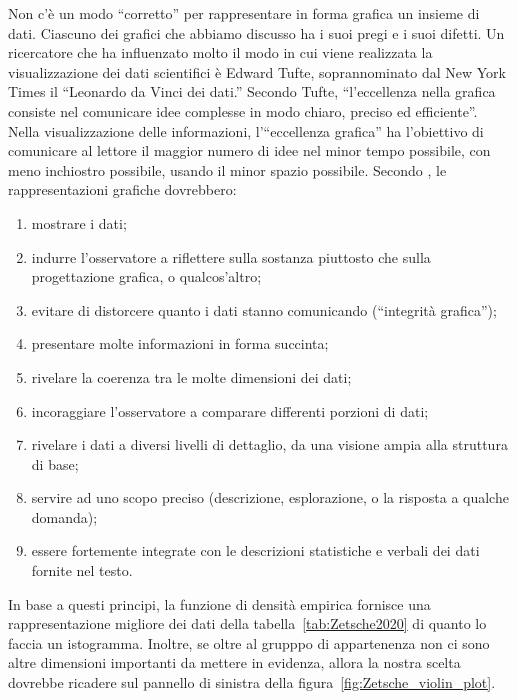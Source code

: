 Non c'è un modo ``corretto'' per rappresentare in forma grafica un insieme di dati.  
Ciascuno dei grafici che abbiamo discusso ha i suoi pregi e i suoi difetti.
Un ricercatore che ha influenzato molto il modo in cui viene realizzata la visualizzazione dei dati scientifici è Edward Tufte, soprannominato dal New York Times il ``Leonardo da Vinci dei dati.'' 
Secondo Tufte, ``l’eccellenza nella grafica consiste nel comunicare idee complesse in modo chiaro, preciso ed efficiente''. 
Nella visualizzazione delle informazioni, l'``eccellenza grafica'' ha l'obiettivo di comunicare al lettore il maggior numero di idee nel minor tempo possibile, con meno inchiostro possibile, usando il minor spazio possibile.
Secondo \citet{tufte_visual_display}, le rappresentazioni grafiche dovrebbero:
\begin{enumerate}
\item mostrare i dati;
\item indurre l'osservatore a riflettere sulla sostanza piuttosto che
sulla progettazione grafica, o qualcos'altro;
\item  evitare di distorcere quanto i dati stanno comunicando (``integrità grafica'');
\item  presentare molte informazioni in forma succinta;
\item  rivelare la coerenza tra le molte dimensioni dei dati;
\item  incoraggiare l'osservatore a comparare differenti porzioni di dati;
\item  rivelare i dati a diversi livelli di dettaglio, da una visione ampia
alla struttura di base;
\item  servire ad uno scopo preciso (descrizione, esplorazione, o la risposta a qualche domanda);
\item essere fortemente integrate con le descrizioni statistiche e verbali dei dati fornite nel testo.
\end{enumerate}
In base a questi principi, la funzione di densità empirica fornisce una rappresentazione migliore dei dati della tabella~\ref{tab:Zetsche2020} di quanto lo faccia un istogramma.
Inoltre, se oltre al grupppo di appartenenza non ci sono altre dimensioni importanti da mettere in evidenza, allora la nostra scelta dovrebbe ricadere sul pannello di sinistra della figura~\ref{fig:Zetsche_violin_plot}.


